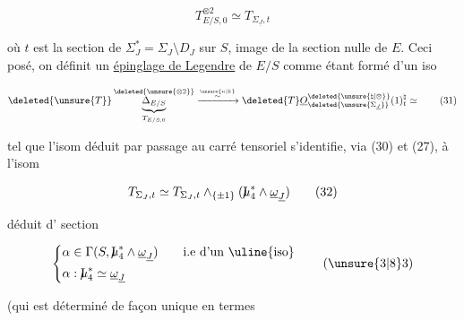 
\[
T_{E/S,0}^{\otimes2}\simeq T_{\Sigma_{\underline J},t}
\tag*{(30)}
\]

où $t$ est la section de $\Sigma_J^*=\Sigma_J\setminus D_J$ sur $S$, image de la section nulle de $E$. Ceci posé, on définit un \uline{épinglage de Legendre} de $E/S$ comme étant formé d'un iso

\[
\deleted{\unsure{T}}\underbrace{\Delta_{E/S}}_{T_{E/S,0}}^{\deleted{\unsure{\otimes2}}}
\xrightarrow{\overset{\unsure{\kappa|k}}{\sim}}
\deleted{T}\underline O_{\deleted{\unsure{\Sigma_{\underline J}}}}^{\deleted{\unsure{\natural|\otimes}}}(1)^{\natural}_t\simeq
\tag*{(31)}
\]

tel que  l'isom  déduit par passage au carré tensoriel s'identifie, via (30) et (27), à l'isom

\[
T_{\Sigma_J,t}\simeq T_{\Sigma_J,t}\wedge_{\{\pm1\}}(\mathord{\mathrm{I}\mkern-7mu\mu}_4^*\wedge\underline\omega_{\underline J})
\tag*{(32)}
\]

déduit d' section

\[
\left\{\begin{aligned}
&\alpha\in\Gamma(S,\mathord{\mathrm{I}\mkern-7mu\mu}_4^*\wedge\underline\omega_{\underline J})\qquad\text{i.e d'un \uline{iso}}\\
&\alpha:\mathord{\mathrm{I}\mkern-7mu\mu}_4^*\simeq\underline\omega_{\underline J}
\end{aligned}\right.
\tag*{(\unsure{3|8}3)}
\]

(qui est déterminé de façon unique en termes
